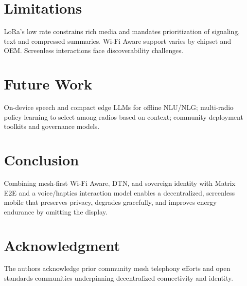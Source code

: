 \documentclass[10pt,journal,compsoc]{IEEEtran}
\begin{document}
\section{Limitations}
LoRa’s low rate constrains rich media and mandates prioritization of signaling, text and compressed summaries. Wi-Fi Aware support varies by chipset and OEM. Screenless interactions face discoverability challenges.

\section{Future Work}
On-device speech and compact edge LLMs for offline NLU/NLG; multi-radio policy learning to select among radios based on context; community deployment toolkits and governance models.

\section{Conclusion}
Combining mesh-first Wi-Fi Aware, DTN, and sovereign identity with Matrix E2E and a voice/haptics interaction model enables a decentralized, screenless mobile that preserves privacy, degrades gracefully, and improves energy endurance by omitting the display.

\section*{Acknowledgment}
The authors acknowledge prior community mesh telephony efforts and open standards communities underpinning decentralized connectivity and identity.
\end{document}
